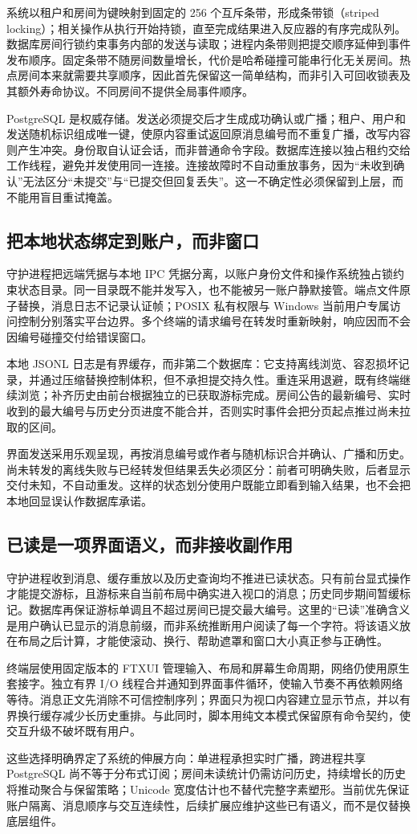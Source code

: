 系统以租户和房间为键映射到固定的 256 个互斥条带，形成条带锁（striped locking）；相关操作从执行开始持锁，直至完成结果进入反应器的有序完成队列。数据库房间行锁约束事务内部的发送与读取；进程内条带则把提交顺序延伸到事件发布顺序。固定条带不随房间数量增长，代价是哈希碰撞可能串行化无关房间。热点房间本来就需要共享顺序，因此首先保留这一简单结构，而非引入可回收锁表及其额外寿命协议。不同房间不提供全局事件顺序。

PostgreSQL 是权威存储\cite{postgres}。发送必须提交后才生成成功确认或广播；租户、用户和发送随机标识组成唯一键，使原内容重试返回原消息编号而不重复广播，改写内容则产生冲突。身份取自认证会话，而非普通命令字段。数据库连接以独占租约交给工作线程，避免并发使用同一连接。连接故障时不自动重放事务，因为“未收到确认”无法区分“未提交”与“已提交但回复丢失”。这一不确定性必须保留到上层，而不能用盲目重试掩盖。

\subsection{把本地状态绑定到账户，而非窗口}

守护进程把远端凭据与本地 IPC 凭据分离，以账户身份文件和操作系统独占锁约束状态目录。同一目录既不能并发写入，也不能被另一账户静默接管。端点文件原子替换，消息日志不记录认证帧；POSIX 私有权限与 Windows 当前用户专属访问控制分别落实平台边界。多个终端的请求编号在转发时重新映射，响应因而不会因编号碰撞交付给错误窗口。

本地 JSONL 日志是有界缓存，而非第二个数据库：它支持离线浏览、容忍损坏记录，并通过压缩替换控制体积，但不承担提交持久性。重连采用退避，既有终端继续浏览；补齐历史由前台根据独立的已获取游标完成。房间公告的最新编号、实时收到的最大编号与历史分页进度不能合并，否则实时事件会把分页起点推过尚未拉取的区间。

界面发送采用乐观呈现，再按消息编号或作者与随机标识合并确认、广播和历史。尚未转发的离线失败与已经转发但结果丢失必须区分：前者可明确失败，后者显示交付未知，不自动重发。这样的状态划分使用户既能立即看到输入结果，也不会把本地回显误认作数据库承诺。

\subsection{已读是一项界面语义，而非接收副作用}

守护进程收到消息、缓存重放以及历史查询均不推进已读状态。只有前台显式操作才能提交游标，且游标来自当前布局中确实进入视口的消息；历史同步期间暂缓标记。数据库再保证游标单调且不超过房间已提交最大编号。这里的“已读”准确含义是用户确认已显示的消息前缀，而非系统推断用户阅读了每一个字符。将该语义放在布局之后计算，才能使滚动、换行、帮助遮罩和窗口大小真正参与正确性。

终端层使用固定版本的 FTXUI 管理输入、布局和屏幕生命周期\cite{ftxui}，网络仍使用原生套接字。独立有界 I/O 线程合并通知到界面事件循环，使输入节奏不再依赖网络等待。消息正文先消除不可信控制序列；界面只为视口内容建立显示节点，并以有界换行缓存减少长历史重排。与此同时，脚本用纯文本模式保留原有命令契约，使交互升级不破坏既有用户。

这些选择明确界定了系统的伸展方向：单进程承担实时广播，跨进程共享 PostgreSQL 尚不等于分布式订阅；房间未读统计仍需访问历史，持续增长的历史将推动聚合与保留策略；Unicode 宽度估计也不替代完整字素塑形。当前优先保证账户隔离、消息顺序与交互连续性，后续扩展应维护这些已有语义，而不是仅替换底层组件。
